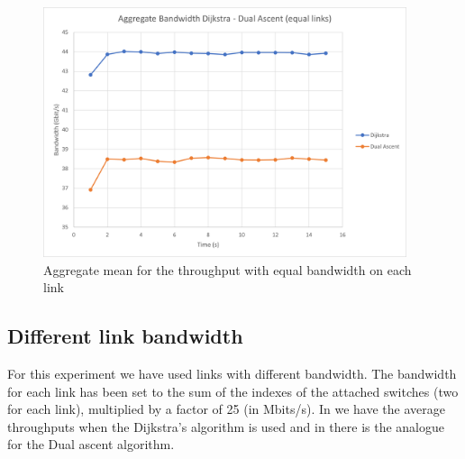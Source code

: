 \begin{figure}[hbt]
	\centering
	\includegraphics[width=0.95\textwidth]{img/aggregate-band-eq.png}
	\caption{Aggregate mean for the throughput with equal bandwidth on each
		link}\label{fig:band-aggregate-eq}
\end{figure}

\subsection{Different link bandwidth}

For this experiment we have used links with different bandwidth. The bandwidth
for each link has been set to the sum of the indexes of the attached switches
(two for each link), multiplied by a factor of 25 (in Mbits/s). In
 we have the average throughputs when the
Dijkstra's algorithm is used and in  there is the
analogue for the Dual ascent algorithm.

